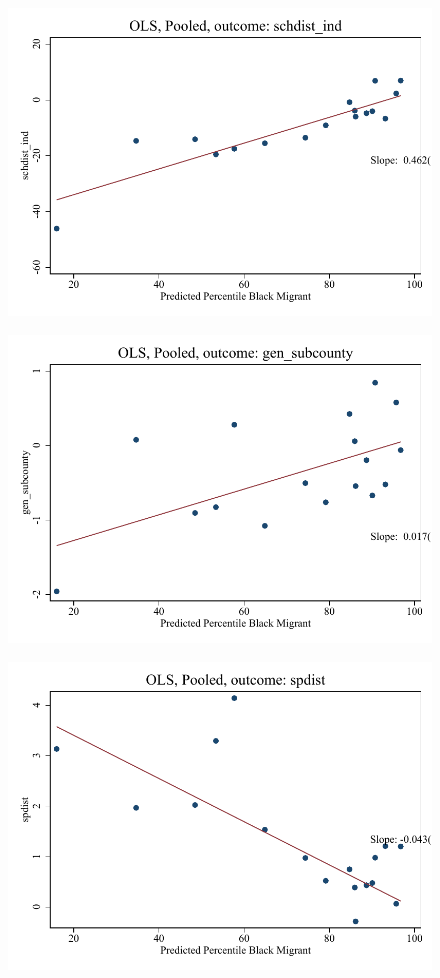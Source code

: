 \documentclass{article}
\begin{document}
\clearpage
\begin{figure}
	\centering
	\includegraphics[width=.8\textwidth]{figures/binscatter/pooled_schdist_ind_ols_percentile.pdf}
\end{figure}
\clearpage
\begin{figure}
	\centering
	\includegraphics[width=.8\textwidth]{figures/binscatter/pooled_gen_subcounty_ols_percentile.pdf}
\end{figure}
\clearpage
\begin{figure}
	\centering
	\includegraphics[width=.8\textwidth]{figures/binscatter/pooled_spdist_ols_percentile.pdf}
\end{figure}
\clearpage
\end{document}
